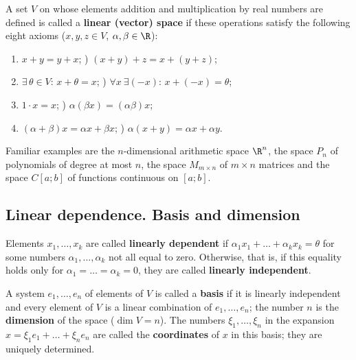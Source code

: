 
\begin{tarif}
A set $V$ on whose elements addition and multiplication by real numbers are
defined is called a \textbf{linear (vector) space} if these operations satisfy
the following eight axioms ($x,y,z\in V$, $\alpha,\beta\in\R$):
\begin{enumerate}[label=\arabic*), itemsep=0pt]
\item $x+y=y+x$; ) $(x+y)+z=x+(y+z)$;
\setcounter{enumi}{2}
\item $\exists\,\theta\in V$: $x+\theta=x$; ) $\forall x\ \exists(-x)$: $x+(-x)=\theta$;
\setcounter{enumi}{4}
\item $1\cdot x=x$; ) $\alpha(\beta x)=(\alpha\beta)x$;
\setcounter{enumi}{6}
\item $(\alpha+\beta)x=\alpha x+\beta x$; ) $\alpha(x+y)=\alpha x+\alpha y$.
\end{enumerate}
\end{tarif}

Familiar examples are the $n$-dimensional arithmetic space $\R^n$, the space
$P_n$ of polynomials of degree at most $n$, the space $M_{m\times n}$ of
$m\times n$ matrices and the space $C[a;b]$ of functions continuous on $[a;b]$.

\subsection{Linear dependence. Basis and dimension}

\begin{tarif}
Elements $x_1,\dots,x_k$ are called \textbf{linearly dependent} if
$\alpha_1x_1+\dots+\alpha_kx_k=\theta$ for some numbers $\alpha_1,\dots,\alpha_k$
not all equal to zero. Otherwise, that is, if this equality holds only for
$\alpha_1=\dots=\alpha_k=0$, they are called \textbf{linearly independent}.
\end{tarif}

\begin{tarif}
A system $e_1,\dots,e_n$ of elements of $V$ is called a \textbf{basis} if it is
linearly independent and every element of $V$ is a linear combination of
$e_1,\dots,e_n$; the number $n$ is the \textbf{dimension} of the space
($\dim V=n$). The numbers $\xi_1,\dots,\xi_n$ in the expansion
$x=\xi_1e_1+\dots+\xi_ne_n$ are called the \textbf{coordinates} of $x$ in this
basis; they are uniquely determined.
\end{tarif}

